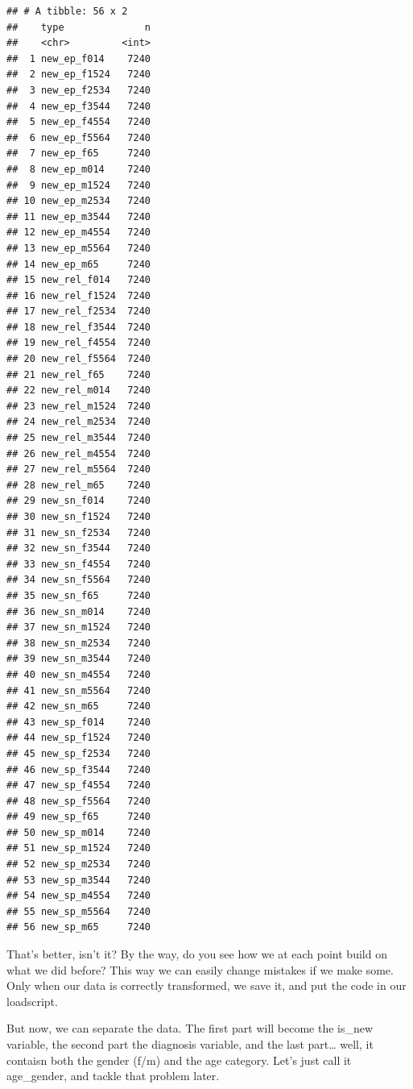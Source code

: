 \documentclass[]{tufte-book}
\newenvironment{Shaded}{}{}
\newcommand{\DataTypeTok}[1]{\textcolor[rgb]{0.56,0.13,0.00}{#1}}
\newcommand{\KeywordTok}[1]{\textcolor[rgb]{0.00,0.44,0.13}{\textbf{#1}}}
\newcommand{\NormalTok}[1]{#1}
\newcommand{\OperatorTok}[1]{\textcolor[rgb]{0.40,0.40,0.40}{#1}}
\newcommand{\StringTok}[1]{\textcolor[rgb]{0.25,0.44,0.63}{#1}}
\begin{document}
\begin{verbatim}
## # A tibble: 56 x 2
##    type              n
##    <chr>         <int>
##  1 new_ep_f014    7240
##  2 new_ep_f1524   7240
##  3 new_ep_f2534   7240
##  4 new_ep_f3544   7240
##  5 new_ep_f4554   7240
##  6 new_ep_f5564   7240
##  7 new_ep_f65     7240
##  8 new_ep_m014    7240
##  9 new_ep_m1524   7240
## 10 new_ep_m2534   7240
## 11 new_ep_m3544   7240
## 12 new_ep_m4554   7240
## 13 new_ep_m5564   7240
## 14 new_ep_m65     7240
## 15 new_rel_f014   7240
## 16 new_rel_f1524  7240
## 17 new_rel_f2534  7240
## 18 new_rel_f3544  7240
## 19 new_rel_f4554  7240
## 20 new_rel_f5564  7240
## 21 new_rel_f65    7240
## 22 new_rel_m014   7240
## 23 new_rel_m1524  7240
## 24 new_rel_m2534  7240
## 25 new_rel_m3544  7240
## 26 new_rel_m4554  7240
## 27 new_rel_m5564  7240
## 28 new_rel_m65    7240
## 29 new_sn_f014    7240
## 30 new_sn_f1524   7240
## 31 new_sn_f2534   7240
## 32 new_sn_f3544   7240
## 33 new_sn_f4554   7240
## 34 new_sn_f5564   7240
## 35 new_sn_f65     7240
## 36 new_sn_m014    7240
## 37 new_sn_m1524   7240
## 38 new_sn_m2534   7240
## 39 new_sn_m3544   7240
## 40 new_sn_m4554   7240
## 41 new_sn_m5564   7240
## 42 new_sn_m65     7240
## 43 new_sp_f014    7240
## 44 new_sp_f1524   7240
## 45 new_sp_f2534   7240
## 46 new_sp_f3544   7240
## 47 new_sp_f4554   7240
## 48 new_sp_f5564   7240
## 49 new_sp_f65     7240
## 50 new_sp_m014    7240
## 51 new_sp_m1524   7240
## 52 new_sp_m2534   7240
## 53 new_sp_m3544   7240
## 54 new_sp_m4554   7240
## 55 new_sp_m5564   7240
## 56 new_sp_m65     7240
\end{verbatim}

That's better, isn't it? By the way, do you see how we at each point build on what we did before? This way we can easily change mistakes if we make some. Only when our data is correctly transformed, we save it, and put the code in our loadscript.

But now, we can separate the data. The first part will become the is\_new variable, the second part the diagnosis variable, and the last part\ldots{} well, it contaisn both the gender (f/m) and the age category. Let's just call it age\_gender, and tackle that problem later.

\begin{Shaded}
\end{Shaded}
\end{document}
